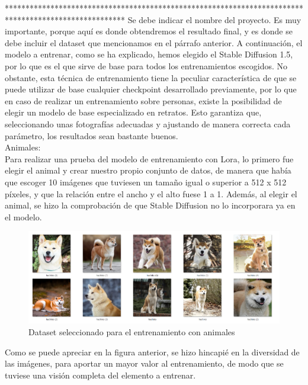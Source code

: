 *****************************************************************************************************
Se debe indicar el nombre del proyecto. Es muy importante, porque  aquí es donde obtendremos el resultado final, y es donde se debe incluir el dataset que mencionamos en el párrafo anterior. A continuación, el modelo a entrenar, como se ha explicado, hemos elegido el Stable Diffusion 1.5, por lo que es el que sirve de base para todos los entrenamientos escogidos. No obstante, esta técnica de entrenamiento tiene la peculiar característica de que se puede utilizar de base cualquier checkpoint desarrollado previamente, por lo que en caso de realizar un entrenamiento sobre personas, existe la posibilidad de elegir un modelo de base especializado en retratos. Esto garantiza que, seleccionando unas fotografías adecuadas y ajustando de manera correcta cada parámetro, los resultados sean bastante buenos.\\

Animales:\\
Para realizar una prueba del modelo de entrenamiento con Lora, lo primero fue elegir el animal y crear nuestro propio conjunto de datos, de manera que había que escoger 10 imágenes que tuviesen un tamaño igual o superior a 512 x 512 píxeles, y que la relación entre el ancho y el alto fuese 1 a 1. Además, al elegir el animal, se hizo la comprobación de que Stable Diffusion no lo incorporara ya en el modelo.\\ 

\begin{figure}[h]
	\centering
	\includegraphics[width = 1
	\textwidth]{Imagenes/Vectorial/dataset_hachiko.png}
	\caption{Dataset seleccionado para el entrenamiento con animales}
	\label{fig:datasethachi}
\end{figure}

Como se puede apreciar en la figura anterior, se hizo hincapié en la diversidad de las imágenes, para aportar un mayor valor al entrenamiento, de modo que se tuviese una visión completa del elemento a entrenar.\\

